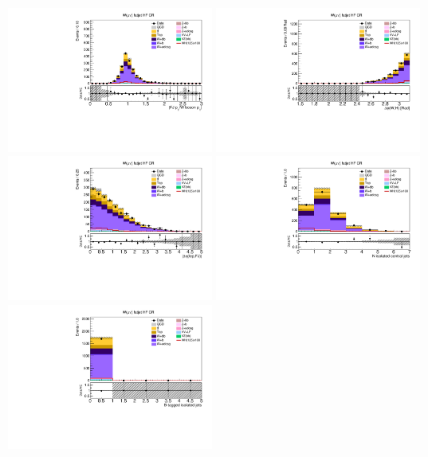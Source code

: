 \begin{figure}[tbp]
  \begin{center}
    \includegraphics[width=0.48\textwidth]{figures/wlnhbb2016/boosted/WmnWHHeavyFlavorFJCR_fj1WPtBalance.pdf}
    \includegraphics[width=0.48\textwidth]{figures/wlnhbb2016/boosted/WmnWHHeavyFlavorFJCR_deltaPhiVH.pdf}
    \includegraphics[width=0.48\textwidth]{figures/wlnhbb2016/boosted/WmnWHHeavyFlavorFJCR_dEtal1fj1.pdf}
    \includegraphics[width=0.48\textwidth]{figures/wlnhbb2016/boosted/WmnWHHeavyFlavorFJCR_nIsojet.pdf}
    \includegraphics[width=0.48\textwidth]{figures/wlnhbb2016/boosted/WmnWHHeavyFlavorFJCR_isojetNBtags.pdf}

\end{center}
\end{figure}
